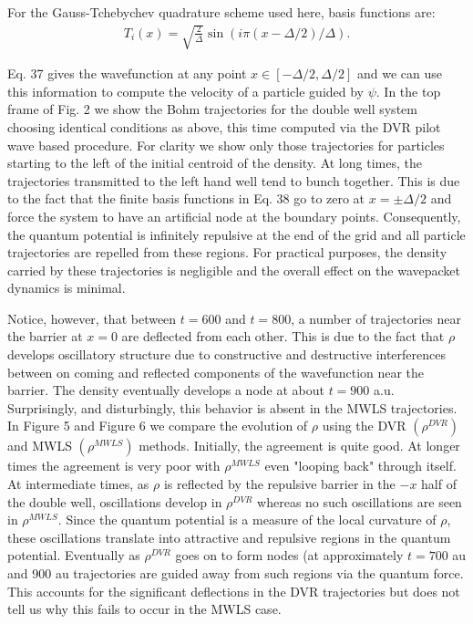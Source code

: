 For the Gauss-Tchebychev quadrature scheme used here, basis functions are:
\begin{eqnarray}
T_i(x) = \sqrt{\frac{2}{\Delta }}
\sin(i \pi (x-\Delta /2)/\Delta ).
    \label{eq:42}
\end{eqnarray}

Eq.  37 gives the wavefunction at any point $x \in 
[-\Delta/2,\Delta/2]$ and we can use this information to compute the 
velocity of a particle guided by $\psi$.  In the top frame of Fig.  2 
we show the Bohm trajectories for the double well system choosing 
identical conditions as above, this time computed via the DVR pilot 
wave based procedure.  For clarity we show only those trajectories for 
particles starting to the left of the initial centroid of the density.  
At long times, the trajectories transmitted to the left hand well tend 
to bunch together.  This is due to the fact that the finite basis 
functions in Eq.  38 go to zero at $x=\pm\Delta/2$ and force the 
system to have an artificial node at the boundary points.  
Consequently, the quantum potential is infinitely repulsive at the end 
of the grid and all particle trajectories are repelled from these 
regions.  For practical purposes, the density carried by these 
trajectories is negligible and the overall effect on the wavepacket 
dynamics is minimal.

Notice, however, that between $t = 600$ and $t = 800$, a number of 
trajectories near the barrier at $x=0$ are deflected from each other.  
This is due to the fact that $\rho$ develops oscillatory structure due 
to constructive and destructive interferences between on coming and 
reflected components of the wavefunction near the barrier.  The 
density eventually develops a node at about $t = 900$ a.u. 
Surprisingly, and disturbingly, this behavior is absent in the MWLS 
trajectories.  In Figure 5 and Figure 6 we compare the evolution of 
$\rho$ using the DVR $(\rho^{DVR})$ and MWLS $(\rho^{MWLS})$ methods.  
Initially, the agreement is quite good.  At longer times the agreement 
is very poor with $\rho^{MWLS}$ even "looping back" through itself.  
At intermediate times, as $\rho$ is reflected by the repulsive barrier 
in the $-x$ half of the double well, oscillations develop in 
$\rho^{DVR}$ whereas no such oscillations are seen in $\rho^{MWLS}$.  
Since the quantum potential is a measure of the local curvature of 
$\rho$, these oscillations translate into attractive and repulsive 
regions in the quantum potential.  Eventually as $\rho^{DVR}$ goes on 
to form nodes (at approximately $ t = 700$ au and 900 au trajectories 
are guided away from such regions via the quantum force.  This 
accounts for the significant deflections in the DVR trajectories but 
does not tell us why this fails to occur in the MWLS case.



